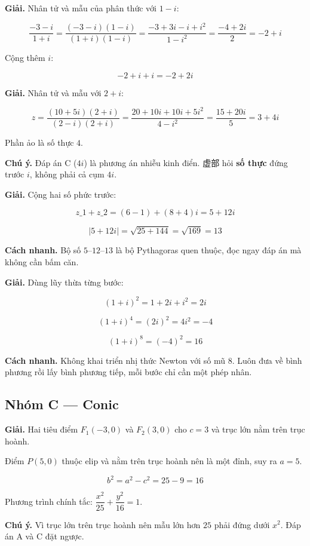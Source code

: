 \documentclass[11pt, a4paper]{article}
\begin{document}
\begin{dapan}[10 — Đáp án C]
\textbf{Giải.} Nhân tử và mẫu của phân thức với $1 - i$:

$$\frac{-3-i}{1+i} = \frac{(-3-i)(1-i)}{(1+i)(1-i)} = \frac{-3 + 3i - i + i^2}{1 - i^2} = \frac{-4 + 2i}{2} = -2 + i$$

Cộng thêm $i$:

$$-2 + i + i = -2 + 2i$$
\end{dapan}

\begin{dapan}[11 — Đáp án B]
\textbf{Giải.} Nhân tử và mẫu với $2 + i$:

$$z = \frac{(10 + 5i)(2 + i)}{(2 - i)(2 + i)} = \frac{20 + 10i + 10i + 5i^2}{4 - i^2} = \frac{15 + 20i}{5} = 3 + 4i$$

Phần ảo là số thực $4$.

\textbf{Chú ý.} Đáp án C ($4i$) là phương án nhiễu kinh điển. 虚部 hỏi \textbf{số thực} đứng trước $i$, không phải cả cụm $4i$.
\end{dapan}

\begin{dapan}[12 — Đáp án B]
\textbf{Giải.} Cộng hai số phức trước:

$$z\_1 + z\_2 = (6 - 1) + (8 + 4)i = 5 + 12i$$

$$\lvert 5 + 12i \rvert = \sqrt{25 + 144} = \sqrt{169} = 13$$

\textbf{Cách nhanh.} Bộ số $5$–$12$–$13$ là bộ Pythagoras quen thuộc, đọc ngay đáp án mà không cần bấm căn.
\end{dapan}

\begin{dapan}[13 — Đáp án A]
\textbf{Giải.} Dùng lũy thừa từng bước:

$$(1+i)^2 = 1 + 2i + i^2 = 2i$$

$$(1+i)^4 = (2i)^2 = 4i^2 = -4$$

$$(1+i)^8 = (-4)^2 = 16$$

\textbf{Cách nhanh.} Không khai triển nhị thức Newton với số mũ $8$. Luôn đưa về bình phương rồi lấy bình phương tiếp, mỗi bước chỉ cần một phép nhân.
\end{dapan}

\subsection*{Nhóm C — Conic}

\begin{dapan}[14 — Đáp án B]
\textbf{Giải.} Hai tiêu điểm $F_1(-3,0)$ và $F_2(3,0)$ cho $c = 3$ và trục lớn nằm trên trục hoành.

Điểm $P(5,0)$ thuộc elip và nằm trên trục hoành nên là một đỉnh, suy ra $a = 5$.

$$b^2 = a^2 - c^2 = 25 - 9 = 16$$

Phương trình chính tắc: $\dfrac{x^2}{25} + \dfrac{y^2}{16} = 1$.

\textbf{Chú ý.} Vì trục lớn trên trục hoành nên mẫu lớn hơn $25$ phải đứng dưới $x^2$. Đáp án A và C đặt ngược.
\end{dapan}
\end{document}
